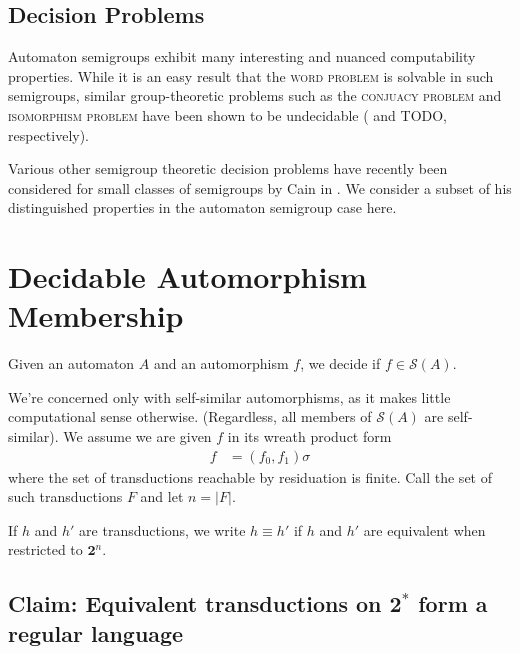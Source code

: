 \documentclass[10pt]{article} %
\newcommand{\decprob}[1]{\textsc{#1}}
\begin{document}
    \subsection*{Decision Problems}
    Automaton semigroups exhibit many interesting and nuanced computability properties. While it is an easy result that the \decprob{word problem} is solvable in such semigroups, similar group-theoretic problems such as the \decprob{conjuacy problem} and \decprob{isomorphism problem} have been shown to be undecidable (\cite{sunic:conj} and TODO, respectively).

    Various other semigroup theoretic decision problems have recently been considered for small classes of semigroups by Cain in \cite{Cain09:dec_prob}. We consider a subset of his distinguished properties in the automaton semigroup case here.


    \section{Decidable Automorphism Membership}


    Given an automaton $A$ and an automorphism $f$, we decide if $f \in \mathcal{S}(A)$.

    We're concerned only with self-similar automorphisms, as it makes little computational sense otherwise. (Regardless, all members of $\mathcal{S}(A)$ are self-similar). We assume we are given $f$ in its wreath product form %
    \begin{align*}
    f &= (f_0, f_1)\sigma
    \end{align*}
    where the set of transductions reachable by residuation is finite. Call the set of such transductions $F$ and let $n = |F|$.

    If $h$ and $h'$ are transductions, we write $h \equiv h'$ if $h$ and $h'$ are equivalent when restricted to $\textbf{2}^n$. 

    \subsection*{Claim: Equivalent transductions on $\textbf{2}^*$ form a regular language}
\end{document}
